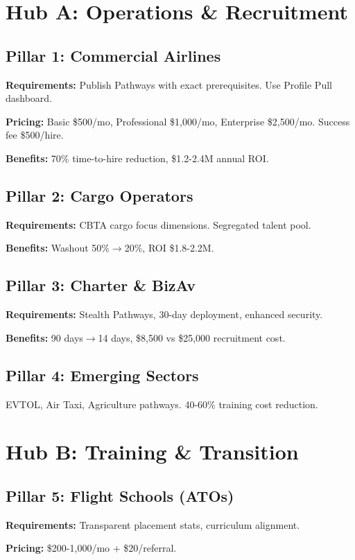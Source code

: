 \documentclass[11pt, a4paper]{article}
\begin{document}
\section{Hub A: Operations \& Recruitment}

\subsection{Pillar 1: Commercial Airlines}
\textbf{Requirements:} Publish Pathways with exact prerequisites. Use Profile Pull dashboard.

\textbf{Pricing:} Basic \$500/mo, Professional \$1,000/mo, Enterprise \$2,500/mo. Success fee \$500/hire.

\textbf{Benefits:} 70\% time-to-hire reduction, \$1.2-2.4M annual ROI.

\subsection{Pillar 2: Cargo Operators}
\textbf{Requirements:} CBTA cargo focus dimensions. Segregated talent pool.

\textbf{Benefits:} Washout 50\%$\rightarrow$20\%, ROI \$1.8-2.2M.

\subsection{Pillar 3: Charter \& BizAv}
\textbf{Requirements:} Stealth Pathways, 30-day deployment, enhanced security.

\textbf{Benefits:} 90 days$\rightarrow$14 days, \$8,500 vs \$25,000 recruitment cost.

\subsection{Pillar 4: Emerging Sectors}
EVTOL, Air Taxi, Agriculture pathways. 40-60\% training cost reduction.

\section{Hub B: Training \& Transition}

\subsection{Pillar 5: Flight Schools (ATOs)}
\textbf{Requirements:} Transparent placement stats, curriculum alignment.

\textbf{Pricing:} \$200-1,000/mo + \$20/referral.
\end{document}
